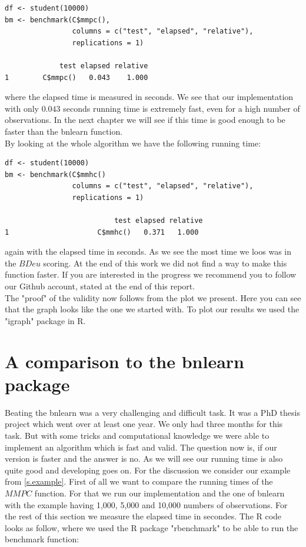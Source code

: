 		\begin{verbatim}
df <- student(10000)
bm <- benchmark(C$mmpc(),
                columns = c("test", "elapsed", "relative"),
                replications = 1)

             test elapsed relative
1        C$mmpc()   0.043    1.000
		\end{verbatim}
		
		where the elapsed time is measured in seconds. We see that our implementation with only $0.043$ seconds running time is extremely fast, even for a high number of observations. In the next chapter we will see if this time is good enough to be faster than the bnlearn function.\\
		By looking at the whole algorithm we have the following running time:

		\begin{verbatim}
df <- student(10000)
bm <- benchmark(C$mmhc()
                columns = c("test", "elapsed", "relative"),
                replications = 1)

                          test elapsed relative
1                     C$mmhc()   0.371   1.000
		\end{verbatim}

		again with the elapsed time in seconds. As we see the most time we loos was in the $BDeu$ scoring. At the end of this work we did not find a way to make this function faster. If you are interested in the progress we recommend you to follow our Github account, stated at the end of this report.\\
		The "proof" of the validity now follows from the plot we present. Here you can see that the graph looks like the one we started with. To plot our results we used the "igraph" package in R.

		 \label{img.resultingGraph}

\chapter{A comparison to the bnlearn package}

	Beating the bnlearn was a very challenging and difficult task. It was a PhD thesis project which went over at least one year. We only had three months for this task. But with some tricks and computational knowledge we were able to implement an algorithm which is fast and valid. The question now is, if our version is faster and the answer is no. As we will see our running time is also quite good and developing goes on. For the discussion we consider our example from \autoref{s.example}. First of all we want to compare the running times of the $MMPC$ function. For that we run our implementation and the one of bnlearn with the example having 1,000, 5,000 and 10,000 numbers of observations. For the rest of this section we measure the elapsed time in secondes. The R code looks as follow, where we used the R package "rbenchmark" to be able to run the benchmark function:

